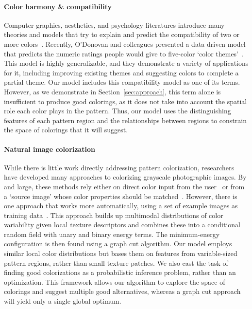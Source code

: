 \paragraph{Color harmony \& compatibility}
Computer graphics, aesthetics, and psychology literatures introduce many theories and models that try to explain and predict the compatibility of two or more colors~\cite{CohenOrHarmonization,Munsell,PalmerColorPreference}. Recently, O'Donovan and colleagues presented a data-driven model that predicts the numeric ratings people would give to five-color `color themes'~. This model is highly generalizable, and they demonstrate a variety of applications for it, including improving existing themes and suggesting colors to complete a partial theme. Our model includes this compatibility model as one of its terms. However, as we demonstrate in Section~\ref{sec:approach}, this term alone is insufficient to produce good colorings, as it does not take into account the spatial role each color plays in the pattern. Thus, our model uses the distinguishing features of each pattern region and the relationships between regions to constrain the space of colorings that it will suggest.

\paragraph{Natural image colorization}
While there is little work directly addressing pattern colorization, researchers have developed many approaches to colorizing grayscale photographic images. By and large, these methods rely either on direct color input from the user~\cite{ScribbleColorization} or from a `source image' whose color properties should be matched~\cite{TransferColorization}. However, there is one approach that works more automatically, using a set of example images as training data~\cite{MultimodalColorization}. This approach builds up multimodal distributions of color variability given local texture descriptors and combines these into a conditional random field with unary and binary energy terms. The minimum-energy configuration is then found using a graph cut algorithm. Our model employs similar local color distributions but bases them on features from variable-sized pattern regions, rather than small texture patches. We also cast the task of finding good colorizations as a probabilistic inference problem, rather than an optimization. This framework allows our algorithm to explore the space of colorings and suggest multiple good alternatives, whereas a graph cut approach will yield only a single global optimum.

